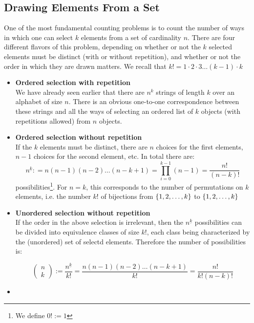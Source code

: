 \documentclass[a4paper]{report}
\DeclarePairedDelimiter\cur{\{}{\}}
\begin{document}
\subsection{Drawing Elements From a Set}
One of the most fundamental counting problems is to count the number of ways in which one can select $k$ elements from a set of cardinality $n$. There are four different flavors of this problem, depending on whether or not the $k$ selected elements must be distinct (with or without repetition), and whether or not the order in which they are drawn matters. We recall that $k!=1\cdot 2\cdot 3\dots (k-1)\cdot k$
\begin{itemize}
\item \textbf{Ordered selection with repetition}\\
We have already seen earlier that there are $n^k$ strings of length $k$ over an alphabet of size $n$. There is an obvious one-to-one correspondence between these strings and all the ways of selecting an ordered list of $k$ objects (with repetitions allowed) from $n$ objects.
\item \textbf{Ordered selection without repetition}\\
If the $k$ elements must be distinct, there are $n$ choices for the first elements, $n-1$ choices for the second element, etc. In total there are:
\[{n^{\underline{k}}}: = n(n - 1)(n - 2) \ldots (n - k + 1) = \prod\limits_{i = 0}^{k - 1} {(n - 1)}  = \frac{{n!}}{{(n - k)!}}\]
possibilities\footnote{We define $0!:=1$}. For $n=k$, this corresponds to the number of permutations on $k$ elements, i.e. the number $k!$ of bijections from $\cur{1,2,\dots,k}$ to $\cur{1,2,\dots,k}$
\item \textbf{Unordered selection without repetition}\\
If the order in the above selection is irrelevant, then the $n^{\underline{k}}$ possibilities can be divided into equivalence classes of size $k!$, each class being characterized by the (unordered) set of selectd elements. Therefore the number of possibilities is:
\begin{framed}
\[\left( {\begin{array}{*{20}{c}}
n\\
k
\end{array}} \right):=\frac{n^{\underline{k}}}{k!}= \frac{{n\left( {n - 1} \right)\left( {n - 2} \right) \ldots \left( {n - k + 1} \right)}}{{k!}} = \frac{{n!}}{{k!\left( {n - k} \right)!}}\]
\end{framed}
\item
\end{itemize}
\end{document}
